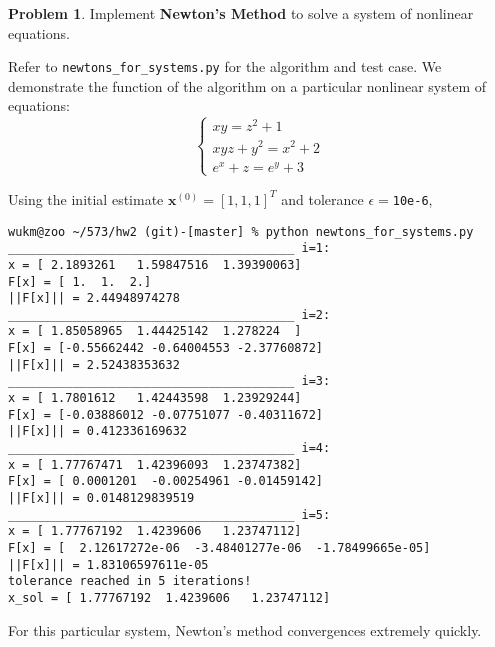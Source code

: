 \documentclass[10pt]{article}
\theoremstyle{plain}
\theoremstyle{definition}
\newtheorem{prob}{Problem}
\numberwithin{equation}{section}
\begin{document}
\begin{prob}
    Implement \textbf{Newton's Method} to solve a system of nonlinear equations. 

    Refer to \texttt{newtons\_for\_systems.py} for the algorithm and test case.
    We demonstrate the function of the algorithm on a particular nonlinear system of equations:
    \[ 
    \begin{cases}
        xy = z^2 + 1 \\
        xyz + y^2 = x^2 + 2 \\
        e^x + z = e^y + 3
    \end{cases}
\]

Using the initial estimate $\bm{x}^{(0)} = [1,1,1]^T$ and tolerance $\epsilon=$\texttt{10e-6},
\begin{small}
\begin{verbatim}
wukm@zoo ~/573/hw2 (git)-[master] % python newtons_for_systems.py
________________________________________ i=1:
x = [ 2.1893261   1.59847516  1.39390063]
F[x] = [ 1.  1.  2.]
||F[x]|| = 2.44948974278
________________________________________ i=2:
x = [ 1.85058965  1.44425142  1.278224  ]
F[x] = [-0.55662442 -0.64004553 -2.37760872]
||F[x]|| = 2.52438353632
________________________________________ i=3:
x = [ 1.7801612   1.42443598  1.23929244]
F[x] = [-0.03886012 -0.07751077 -0.40311672]
||F[x]|| = 0.412336169632
________________________________________ i=4:
x = [ 1.77767471  1.42396093  1.23747382]
F[x] = [ 0.0001201  -0.00254961 -0.01459142]
||F[x]|| = 0.0148129839519
________________________________________ i=5:
x = [ 1.77767192  1.4239606   1.23747112]
F[x] = [  2.12617272e-06  -3.48401277e-06  -1.78499665e-05]
||F[x]|| = 1.83106597611e-05
tolerance reached in 5 iterations!
x_sol = [ 1.77767192  1.4239606   1.23747112]
\end{verbatim}
\end{small}

For this particular system, Newton's method convergences extremely quickly.

\end{prob}
\hrulefill
\end{document}

